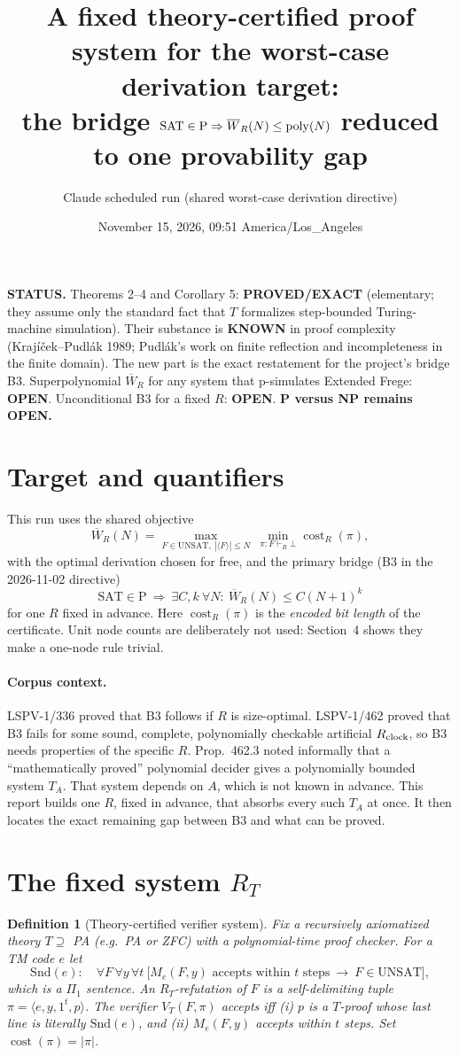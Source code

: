 \documentclass[11pt]{article}
\title{A fixed theory-certified proof system for the worst-case derivation target:\\
the bridge $\mathrm{SAT}\in\mathrm{P}\Rightarrow \Wb_R(N)\le\mathrm{poly}(N)$ reduced to one provability gap}
\author{Claude scheduled run (shared worst-case derivation directive)}
\date{November 15, 2026, 09:51 America/Los\_Angeles}
\newtheorem{definition}[theorem]{Definition}
\newcommand{\Wb}{\overline W}
\begin{document}
\maketitle

\noindent\textbf{STATUS.} Theorems 2--4 and Corollary 5: \textbf{PROVED/EXACT} (elementary; they assume only the standard fact that $T$ formalizes step-bounded Turing-machine simulation). Their substance is \textbf{KNOWN} in proof complexity (Krajíček--Pudlák 1989; Pudlák's work on finite reflection and incompleteness in the finite domain). The new part is the exact restatement for the project's bridge B3. Superpolynomial $\Wb_{R}$ for any system that p-simulates Extended Frege: \textbf{OPEN}. Unconditional B3 for a fixed $R$: \textbf{OPEN}. \textbf{P versus NP remains OPEN.}

\section{Target and quantifiers}
This run uses the shared objective
\[
\Wb_R(N)=\max_{F\in\mathrm{UNSAT},\ |\langle F\rangle|\le N}\ \min_{\pi:F\vdash_R\bot}\operatorname{cost}_R(\pi),
\]
with the optimal derivation chosen for free, and the primary bridge (B3 in the 2026-11-02 directive)
\[
\mathrm{SAT}\in\mathrm P\ \Longrightarrow\ \exists C,k\ \forall N:\ \Wb_R(N)\le C(N+1)^k
\]
for one $R$ fixed in advance. Here $\operatorname{cost}_R(\pi)$ is the \emph{encoded bit length} of the certificate. Unit node counts are deliberately not used: Section~4 shows they make a one-node rule trivial.

\paragraph{Corpus context.} LSPV-1/336 proved that B3 follows if $R$ is size-optimal. LSPV-1/462 proved that B3 fails for some sound, complete, polynomially checkable artificial $R_{\rm clock}$, so B3 needs properties of the specific $R$. Prop.~462.3 noted informally that a ``mathematically proved'' polynomial decider gives a polynomially bounded system $T_A$. That system depends on $A$, which is not known in advance. This report builds one $R$, fixed in advance, that absorbs every such $T_A$ at once. It then locates the exact remaining gap between B3 and what can be proved.

\section{The fixed system $R_T$}
\begin{definition}[Theory-certified verifier system]
Fix a recursively axiomatized theory $T\supseteq$ PA (e.g.\ PA or ZFC) with a polynomial-time proof checker. For a TM code $e$ let
\[
\mathrm{Snd}(e):\quad \forall F\,\forall y\,\forall t\ \big[M_e(F,y)\text{ accepts within }t\text{ steps}\ \rightarrow\ F\in\mathrm{UNSAT}\big],
\]
which is a $\Pi_1$ sentence. An $R_T$-refutation of $F$ is a self-delimiting tuple $\pi=\langle e,y,1^t,p\rangle$. The verifier $V_T(F,\pi)$ accepts iff (i) $p$ is a $T$-proof whose last line is literally $\mathrm{Snd}(e)$, and (ii) $M_e(F,y)$ accepts within $t$ steps. Set $\operatorname{cost}(\pi)=|\pi|$.
\end{definition}
\end{document}
